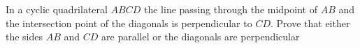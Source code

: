 In a cyclic quadrilateral $ABCD$ the line passing through the midpoint of $AB$ and the intersection point of the diagonals is perpendicular to $CD$. Prove that either the sides $AB$ and $CD$ are parallel or the diagonals are perpendicular